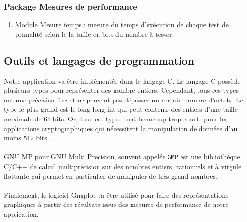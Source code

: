 		\subsubsection*{Package Mesures de performance}
			\begin{enumerate}[leftmargin=*]
				\item Module Mesure temps : mesure du temps d'exécution de chaque test de primalité selon le la taille en bits du nombre à tester.
			\end{enumerate}
	
	\subsection{Outils et langages de programmation}
	Notre application va être implémentée dans le langage {\ttfamily C}. Le langage {\ttfamily C} possède plusieurs types pour représenter des nombre entiers. Cependant, tous ces types ont une précision fixe et ne peuvent pas dépasser un certain nombre d'octets. Le type le plus grand est le {\ttfamily long long int} qui peut contenir des entiers d'une taille maximale de 64 bits. Or, tous ces types sont beaucoup trop courts pour les applications cryptographiques qui nécessitent la manipulation de données d'au moins 512 bits.
	\paragraph{}{\ttfamily GNU MP} pour {\ttfamily GNU Multi Precision}, souvent appelée \lstinline!GMP! est une bibliothèque {\ttfamily C}/{\ttfamily C++} de calcul multiprécision sur des nombres entiers, rationnels et à virgule flottante qui permet en particulier de manipuler de très grand nombres.
	
	\paragraph{} Finalement, le logiciel {\ttfamily Gnuplot} va être utilisé pour faire des représentations graphiques à partir des résultats issus des mesures de performance de notre application.
	